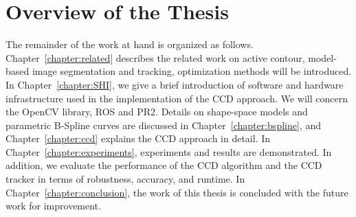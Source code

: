 

\section{Overview of the Thesis}
\label{sec:overview}
The remainder of the work at hand is organized as
follows. Chapter~\ref{chapter:related} describes the related work on
active contour, model-based image segmentation and tracking, optimization methods will be
introduced. In Chapter~\ref{chapter:SHI}, we give a brief introduction of software
and hardware infrastructure used in the implementation of the CCD
approach. We will concern the OpenCV library, ROS and PR2. Details on shape-space models and parametric
B-Spline curves are discussed in Chapter~\ref{chapter:bspline},  and
Chapter~\ref{chapter:ccd} explains the CCD approach in detail. 
In Chapter~\ref{chapter:experiments}, experiments and results are demonstrated. In
addition, we evaluate the performance of the CCD algorithm and the CCD
tracker in terms of robustness, accuracy, and runtime. In Chapter~\ref{chapter:conclusion},
the work of this thesis is concluded with the future work for improvement.



